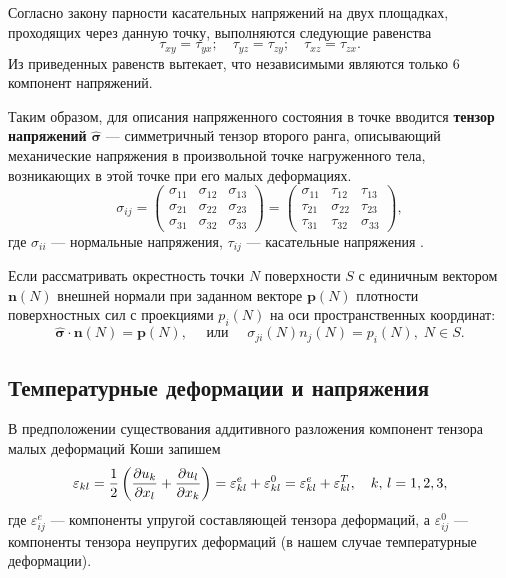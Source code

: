 \documentclass[12pt, a4paper]{article}
\begin{document}
Согласно закону парности касательных напряжений на двух площадках, проходящих через данную точку, выполняются следующие равенства
\[
\tau_{xy} = \tau_{yx};\quad \tau_{yz} = \tau_{zy};\quad \tau_{xz} = \tau_{zx}.
\]
Из приведенных равенств вытекает, что независимыми являются только 6 компонент напряжений.

Таким образом, для описания напряженного состояния в точке вводится \textbf{тензор напряжений} $\boldsymbol{\hat\sigma}$ ---  симметричный тензор второго ранга, описывающий механические напряжения в произвольной точке нагруженного тела, возникающих в этой точке при его малых деформациях.
\begin{equation}
\sigma_{ij} = 
\begin{pmatrix}
	\sigma_{11}&\sigma_{12}&\sigma_{13}\\
	\sigma_{21}&\sigma_{22}&\sigma_{23}\\
	\sigma_{31}&\sigma_{32}&\sigma_{33}
\end{pmatrix} =
\begin{pmatrix}
	\sigma_{11}&\tau_{12}&\tau_{13}\\
	\tau_{21}&\sigma_{22}&\tau_{23}\\
	\tau_{31}&\tau_{32}&\sigma_{33}
\end{pmatrix},
\end{equation}
где $\sigma_{ii}$ --- нормальные напряжения, $\tau_{ij}$ --- касательные напряжения \cite{kovalenko}.

Если рассматривать окрестность точки $N$ поверхности $S$ с единичным вектором $\boldsymbol n(N)$ внешней нормали при заданном векторе $\boldsymbol p(N)$ плотности поверхностных сил с проекциями $p_i(N)$ на оси пространственных координат:
\begin{equation}
	\boldsymbol{\hat \sigma} \cdot \boldsymbol n(N) = \boldsymbol p(N),\quad\text{ или }\quad \sigma_{ji}(N)n_j(N)=p_i(N),\; N \in S. 
	\label{eq:1.10}
\end{equation}

\subsection{Температурные деформации и напряжения}
В предположении существования аддитивного разложения компонент тензора малых деформаций Коши запишем
\begin{equation}
	\varepsilon_{kl} = \frac12\left(\frac{\partial u_k}{\partial x_l}+\frac{\partial u_l}{\partial x_k}\right)=\varepsilon_{kl}^e+\varepsilon_{kl}^0=\varepsilon_{kl}^e+\varepsilon_{kl}^T,\quad k,\,l=1,2,3,
	\label{eq:1.11}
\end{equation}
где $\varepsilon_{ij}^e$ --- компоненты упругой составляющей тензора деформаций, а $\varepsilon_{ij}^0$ --- компоненты тензора неупругих деформаций (в нашем случае температурные деформации).	
\end{document}
